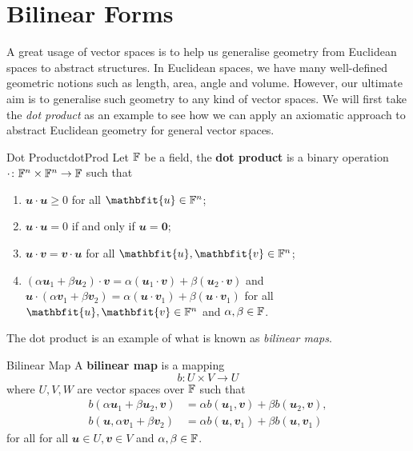 \documentclass[math]{amznotes}
\theoremstyle{remark}
\newcommand{\zero}{\mathbf{0}}
\begin{document}
\section{Bilinear Forms}
A great usage of vector spaces is to help us generalise geometry from Euclidean spaces to abstract structures. In Euclidean spaces, we have many well-defined geometric notions such as length, area, angle and volume. However, our ultimate aim is to generalise such geometry to any kind of vector spaces. We will first take the \textit{dot product} as an example to see how we can apply an axiomatic approach to abstract Euclidean geometry for general vector spaces.
\begin{dfnbox}{Dot Product}{dotProd}
    Let $\mathbb{F}$ be a field, the {\color{red} \textbf{dot product}} is a binary operation $\cdot \colon \mathbb{F}^n \times \mathbb{F}^n \to \mathbb{F}$ such that 
    \begin{enumerate}
        \item $\mathbfit{u} \cdot \mathbfit{u} \geq 0$ for all $\mathbfit{u} \in \F^n$;
        \item $\mathbfit{u} \cdot \mathbfit{u} = 0$ if and only if $\mathbfit{u} = \zero$;
        \item $\mathbfit{u} \cdot \mathbfit{v} = \mathbfit{v} \cdot \mathbfit{u}$ for all $\mathbfit{u}, \mathbfit{v} \in \F^n$;
        \item $(\alpha\mathbfit{u}_1 + \beta\mathbfit{u}_2) \cdot \mathbfit{v} = \alpha(\mathbfit{u}_1 \cdot \mathbfit{v}) + \beta(\mathbfit{u}_2 \cdot \mathbfit{v})$ and $\mathbfit{u} \cdot (\alpha\mathbfit{v}_1 + \beta\mathbfit{v}_2) = \alpha(\mathbfit{u} \cdot \mathbfit{v}_1) + \beta(\mathbfit{u} \cdot \mathbfit{v}_1)$ for all $\mathbfit{u}, \mathbfit{v} \in \F^n$ and $\alpha, \beta \in \mathbb{F}$.
    \end{enumerate}
\end{dfnbox}
The dot product is an example of what is known as \textit{bilinear maps}. 
\begin{dfnbox}{Bilinear Map}
    A {\color{red} \textbf{bilinear map}} is a mapping
    \begin{equation*}
        b \colon U \times V \to U
    \end{equation*}   
    where $U, V, W$ are vector spaces over $\mathbb{F}$ such that
    \begin{align*}
        b(\alpha\mathbfit{u}_1 + \beta\mathbfit{u}_2, \mathbfit{v}) & = \alpha b(\mathbfit{u}_1, \mathbfit{v}) + \beta b(\mathbfit{u}_2, \mathbfit{v}), \\
        b(\mathbfit{u}, \alpha\mathbfit{v}_1 + \beta\mathbfit{v}_2) & = \alpha b(\mathbfit{u}, \mathbfit{v}_1) + \beta b(\mathbfit{u}, \mathbfit{v}_1)
    \end{align*}
    for all for all $\mathbfit{u} \in U, \mathbfit{v} \in V$ and $\alpha, \beta \in \mathbb{F}$.
\end{dfnbox}
\end{document}
